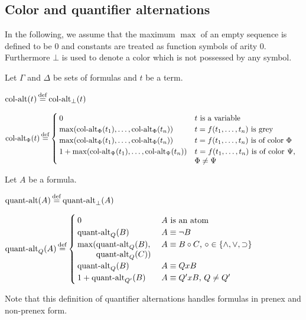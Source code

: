 \documentclass[,%
	draft=false,%
	numbers=noendperiod
	12pt,
	a4paper,
	oneside,%
	openany,
]{memoir}
\begin{document}
\subsection{Color and quantifier alternations}

In the following, we assume that the maximum $\max$ of an empty sequence is defined to be $0$ and constants are treated as function symbols of arity $0$.
Furthermore $\bot$ is used to denote a color which is not possessed by any symbol.
\begin{defi}
	Let $\Gamma$ and $\Delta$ be sets of formulas and $t$ be a term.

	\medskip

	\noindent
	$\ca(t) \defeq \ca_\bot(t)$
	\medskip

	\noindent
	$
	\ca_\Phi(t) \defeq 
	\begin{cases}
		0 & \text{$t$ is a variable} \\
		\max(\ca_\Phi(t_1), \dots, \ca_\Phi(t_n)) & \text{$t = f(t_1, \dots, t_n)$ is grey} \\
		\max(\ca_\Phi(t_1), \dots, \ca_\Phi(t_n)) & \parbox[t]{0.4\textwidth}{$t = f(t_1, \dots, t_n)$ is of color $\Phi$} \\
		1 + \max(\ca_\Psi(t_1), \dots, \ca_\Psi(t_n)) & \parbox[t]{0.38\textwidth}{$t = f(t_1, \dots, t_n)$ is of color $\Psi$, $\Phi \neq \Psi$} \\
	\end{cases}
	$
\end{defi}


\begin{defi}
	Let $A$ be a formula.\nopagebreak
	\medskip

	\noindent
	$\qa(A) \defeq \qa_\bot(A)$
	\nopagebreak
	\medskip

	\noindent
	$
	\qa_Q(A) \defeq 
	\begin{cases}
		0 & \text{$A$ is an atom} \\
		\qa_Q(B) & \text{$A \equiv \lnot B$} \\
		\max(\parbox[t]{0.2\textwidth}{$\qa_Q(B),$\newline$ \qa_Q(C))$} & \text{$A \equiv B \circ C$, $\circ \in \{\land, \lor, \limpl\}$} \\
		\qa_Q(B) & \text{$A \equiv Q x B$} \\
		1+\qa_{Q'}(B) & \text{$A \equiv Q' x B$, $Q \neq Q'$}  \\
	\end{cases}
	$
	\nopagebreak

	\qedhere
\end{defi}
Note that this definition of quantifier alternations handles formulas in prenex and non-prenex form.
\end{document}
